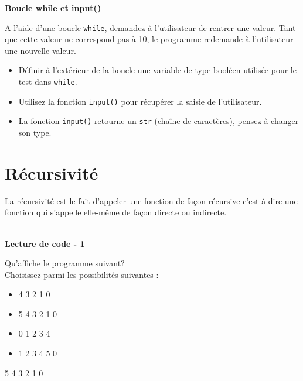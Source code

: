     
 \begin{Exercice}[10 minutes] \textbf{Boucle while et input()}
      	
      	A l'aide d'une boucle \lstinline{while}, demandez à l'utilisateur de rentrer une valeur. Tant que cette valeur ne correspond pas à 10, le programme redemande à l'utilisateur une nouvelle valeur.
    
        \begin{conseil}
           \begin{itemize}
           	\item Définir à l'extérieur de la boucle une variable de type booléen utilisée pour le test dans \lstinline{while}.
           	\item Utilisez la fonction \lstinline{input()} pour récupérer la saisie de l'utilisateur.
           	\item La fonction \lstinline{input()} retourne un \lstinline{str} (chaîne de caractères), pensez à changer son type.
           \end{itemize}
		     
        \end{conseil}
        
        \begin{solution}
            
        \end{solution}
    \end{Exercice}
    

     \section{Récursivité}
    
    La récursivité est le fait d'appeler une fonction de façon récursive c'est-à-dire une fonction qui s'appelle elle-même de façon directe ou indirecte. \\\\
    
	\begin{Exercice}[5 minutes] \textbf{Lecture de code - 1} 
	
	Qu'affiche le programme suivant? \\ 
	
	 
	
	Choisissez parmi les possibilités suivantes : \\
	
	\begin{itemize}
	\item 4  
	3 
	2 
	1 
	0 
	\item 5 
	4 
	3 
	2 
    1 
    0
	\item 0 
	1 
	2 
	3 
	4 
	\item 1 
	2 
	3 
	4
    5
    0
    \end{itemize}
    \begin{solution} 
			5  
			4  
			3  
			2  
			1  
			0  
		\end{solution} 
    
\end{Exercice}

